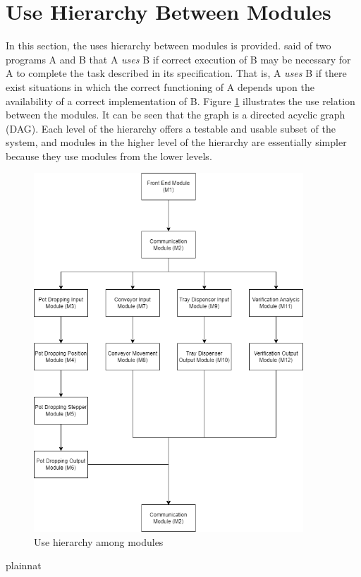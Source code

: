\documentclass[12pt, titlepage]{article}
\begin{document}
\section{Use Hierarchy Between Modules} \label{SecUse}

In this section, the uses hierarchy between modules is
provided. \citet{Parnas1978} said of two programs A and B that A {\em uses} B if
correct execution of B may be necessary for A to complete the task described in
its specification. That is, A {\em uses} B if there exist situations in which
the correct functioning of A depends upon the availability of a correct
implementation of B.  Figure \ref{FigUH} illustrates the use relation between
the modules. It can be seen that the graph is a directed acyclic graph
(DAG). Each level of the hierarchy offers a testable and usable subset of the
system, and modules in the higher level of the hierarchy are essentially simpler
because they use modules from the lower levels.

\begin{figure}[H]
\centering
\includegraphics[width=0.9\textwidth]{module_guide.png}
\caption{Use hierarchy among modules}
\label{FigUH}
\end{figure}


 {plainnat}


\newpage{}
\end{document}
